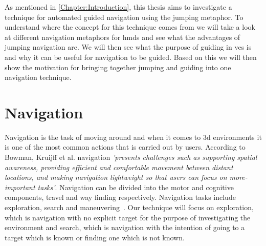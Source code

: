 \label{Chapter:Related Work}
As mentioned in \cref{Chapter:Introduction}, this thesis aims to investigate a technique for automated guided navigation using the jumping metaphor. To understand where the concept for this technique comes from we will take a look at different navigation metaphors for \acrshort{hmd}s and see what the advantages of jumping navigation are. We will then see what the purpose of guiding in \acrshort{ve}s is and why it can be useful for navigation to be guided. Based on this we will then show the motivation for bringing together jumping and guiding into one navigation technique. 

\section{Navigation}
\label{section RW: Navigation}

Navigation is the task of moving around and when it comes to \acrfull{3d} environments it is one of the most common actions that is carried out by users. According to Bowman, Kruijff et al. navigation \textit{'presents challenges such as supporting spatial awareness, providing efficient and comfortable movement between distant locations, and making navigation lightweight so that users can focus on more-important tasks'}. Navigation can be divided into the motor and cognitive components, travel and way finding respectively. Navigation tasks include exploration, search and maneuvering~\cite{Bowman2001}. Our technique will focus on exploration, which is navigation with no explicit target for the purpose of investigating the environment and search, which is navigation with the intention of going to a target which is known or finding one which is not known.

